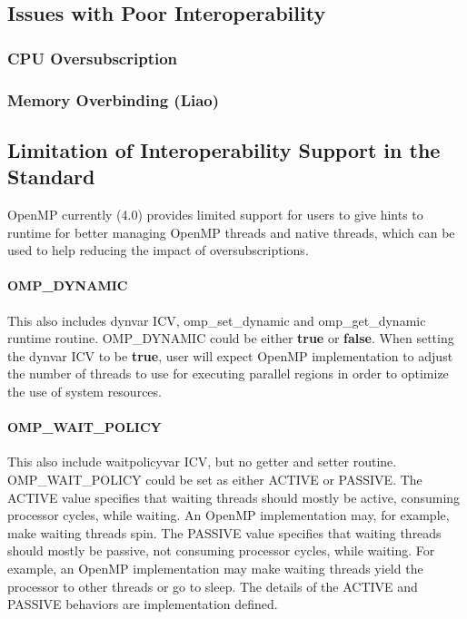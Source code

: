 \subsection{Issues with Poor Interoperability}
\subsubsection{CPU Oversubscription}


\subsubsection{Memory Overbinding (Liao)}

\subsection{Limitation of Interoperability Support in the Standard}
OpenMP currently (4.0) provides limited support for users to give hints to runtime for 
better managing OpenMP threads and native threads, which can be used to help reducing 
the impact of oversubscriptions.
\paragraph{OMP\_DYNAMIC} %
This also includes dynvar ICV, omp\_set\_dynamic and omp\_get\_dynamic runtime routine. OMP\_DYNAMIC could be either
{\bf true} or {\bf false}. When setting the dynvar ICV to be {\bf true}, user will expect
OpenMP implementation to adjust the number of threads to use for executing parallel
regions in order to optimize the use of system resources.

\paragraph{OMP\_WAIT\_POLICY} %
This also include waitpolicyvar ICV, but no getter and setter routine. 
OMP\_WAIT\_POLICY could be set as either ACTIVE or PASSIVE. 
The ACTIVE value specifies that waiting threads should mostly be active, consuming processor
 cycles, while waiting. An OpenMP implementation may, for example, make waiting threads spin.
 The PASSIVE value specifies that waiting threads should mostly be passive, not consuming
 processor cycles, while waiting. For example, an OpenMP implementation may make waiting
 threads yield the processor to other threads or go to sleep.
 The details of the ACTIVE and PASSIVE behaviors are implementation defined.
 
